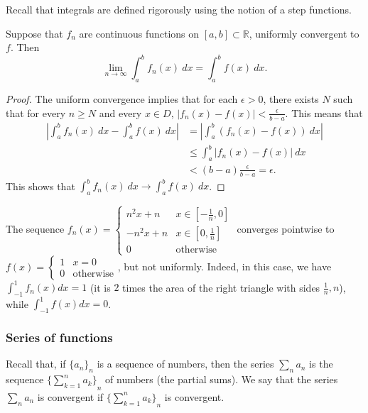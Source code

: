 Recall that integrals are defined rigorously using the notion of a step functions.

\begin{theorem}%
  \label{thm:limit-of-integral}
  Suppose that \(f_n\) are continuous functions on \([a,b] \subset \mathbb{R}\), uniformly convergent to \(f\).
  Then
  \[
    \lim_{n\to \infty} \int_{a}^{b} f_n(x) \ dx = \int_{a}^{b} f(x) \ dx.
  \]
\end{theorem}

\begin{proof}
  The uniform convergence implies that for each \(\epsilon>0\), there exists \(N\) such that for every \(n\geq N\) and every \(x\in D\), \(|f_n(x) - f(x)| <  \frac{\epsilon}{b-a}\).
  This means that
  \[
    \begin{aligned}
      \left| \int_{a}^{b} f_n(x) \ dx - \int_{a}^{b} f(x) \ dx \right|
      &= \left| \int_{a}^{b} (f_n(x) - f(x)) \ dx \right| \\
       & \leq \int_{a}^{b} | f_n(x) - f(x) | \ dx    \\
       & < (b-a) \frac{\epsilon}{b-a} = \epsilon.
    \end{aligned}
  \]
  This shows that \(\int_{a}^{b} f_n(x) \ dx \to  \int_{a}^{b} f(x) \ dx\).
\end{proof}

\begin{example*}
  The sequence \(f_n(x) = \begin{cases} n^2x + n & x \in [-\frac1n, 0] \\ -n^2x + n & x \in [0, \frac1n] \\ 0 & \text{otherwise} \end{cases}\) converges
  pointwise to $f(x) = \begin{cases} 1 & x = 0 \\ 0 & \text{otherwise} \end{cases}$, but not uniformly.
  Indeed, in this case, we have
  $\int_{-1}^1 f_n(x)dx = 1$ (it is $2$ times the area of the right triangle with sides $\frac1n, n$),
  while $\int_{-1}^1 f(x)dx = 0$.
\end{example*}


\subsubsection*{Series of functions}



Recall that, if \({\{a_n\}}_{n}\) is  a sequence of numbers, then
the series \(\sum_{n}a_n\) is the sequence \({\{\sum_{k=1}^{n}a_k\}}_{n}\) of numbers (the partial sums).
We say that the series  \(\sum_{n}a_n\) is convergent if \({\{\sum_{k=1}^{n}a_k\}}_{n}\) is convergent.




